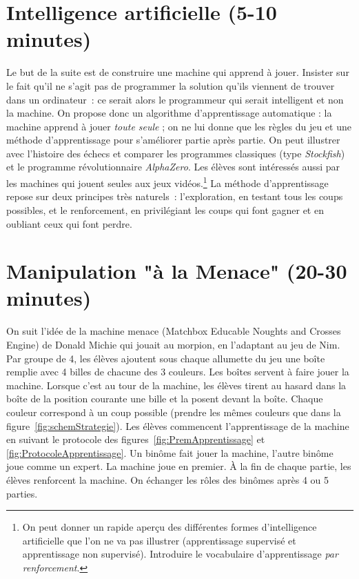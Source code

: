 \documentclass[a4paper,12pt]{article}
\begin{document}
\section{Intelligence artificielle (5-10 minutes)} \label{intelligence-artificielle-5-10-minutes}
\noindent Le but de la suite est de construire une machine qui apprend à jouer. Insister sur le fait qu'il ne s'agit pas de
programmer la solution qu'ils viennent de trouver dans un ordinateur~: ce serait alors le programmeur qui serait
intelligent et non la machine. On propose donc un algorithme d'apprentissage automatique : la machine apprend à jouer
\emph{toute seule} ; on ne lui donne que les règles du jeu et une méthode d'apprentissage pour s'améliorer partie après
partie. On peut illustrer avec l'histoire des échecs et comparer les programmes classiques (type \emph{Stockfish}) et le
programme révolutionnaire \emph{AlphaZero}. Les élèves sont intéressés aussi par les machines qui jouent seules aux jeux
vidéos.\footnote{On peut donner un rapide aperçu des différentes formes d'intelligence artificielle que l'on ne va pas
illustrer (apprentissage supervisé et apprentissage non supervisé). Introduire le vocabulaire d'apprentissage \emph{par renforcement}.}
%
La méthode d'apprentissage repose sur deux principes très naturels~: l'exploration, en testant tous les coups possibles, et le renforcement, en privilégiant les coups qui font gagner et en oubliant ceux qui font perdre.

\section{Manipulation "à la Menace" (20-30 minutes)}
\label{manipulation-uxe0-la-menace-20-30-minutes}
\noindent On suit l'idée de la machine {\sc menace} (Matchbox Educable Noughts and Crosses Engine) 
de Donald Michie \cite{Michie, Wiki} qui jouait au morpion, en l'adaptant au jeu de Nim.
%
Par groupe de 4, les élèves ajoutent sous chaque allumette du jeu une boîte remplie avec 4 billes de chacune des 3 couleurs. Les boîtes servent à faire jouer la machine. Lorsque c'est au tour de la machine, les élèves tirent au hasard dans la boîte de la position courante une bille et la posent devant la boîte. Chaque couleur correspond à un coup possible (prendre les mêmes couleurs que dans la figure~\ref{fig:schemStrategie}).
%
Les élèves commencent l'apprentissage de la machine en suivant le protocole des figures~\ref{fig:PremApprentissage} et \ref{fig:ProtocoleApprentissage}. 
Un binôme fait jouer la machine, l'autre binôme joue comme un expert. La machine joue en premier. À la fin de chaque partie, les élèves renforcent la machine. 
On échanger les rôles des binômes après  4 ou 5 parties.
\end{document}

